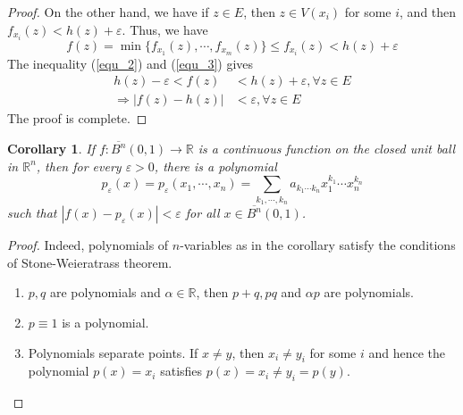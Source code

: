 \documentclass[12pt,leqno]{amsart}
\newtheorem{corollary}{Corollary}[theorem]
\theoremstyle{definition}
\numberwithin{equation}{subsection}
\begin{document}
\begin{proof}
On the other hand, we have if $z\in E$, then $z\in V(x_i)$ for some $i$, and then $f_{x_i}(z) < h(z) + \varepsilon$. Thus, we have 
\begin{equation}\label{equ_3}
    f(z) = \min\{f_{x_1}(z), \cdots,f_{x_m}(z)\} \leq f_{x_i}(z) < h(z) + \varepsilon
\end{equation}
The inequality (\ref{equ_2}) and (\ref{equ_3}) gives 
\begin{align*}
    h(z) - \varepsilon < f(z) & < h(z) + \varepsilon, \forall z\in E \\
    \Rightarrow \left|f(z) - h(z)\right| & < \varepsilon, \forall z\in E
\end{align*}
The proof is complete.
\end{proof}

\begin{corollary}
If $f:\overline{B^n}(0,1)\to\mathbb{R}$ is a continuous function on the closed unit ball in $\mathbb{R}^n$, then for every $\varepsilon > 0$, there is a polynomial $$p_\varepsilon(x) = p_\varepsilon(x_1,\cdots,x_n) = \sum_{k_1,\cdots,k_n}a_{k_1 \cdots k_n}x_1^{k_1}\cdots x_n^{k_n}$$
such that $|f(x) - p_\varepsilon(x)| < \varepsilon$ for all $x\in \overline{B^n}(0,1)$.
\end{corollary}
\begin{proof}
Indeed, polynomials of $n$-variables as in the corollary satisfy the conditions of Stone-Weieratrass theorem.
\begin{enumerate}
    \item $p,q$ are polynomials and $\alpha\in\mathbb{R}$, then $p+q, pq$ and $\alpha p$ are polynomials.
    \item $p\equiv 1$ is a polynomial.
    \item Polynomials separate points. If $x\neq y$, then $x_i\neq y_i$ for some $i$ and hence the polynomial $p(x) = x_i$ satisfies $p(x) = x_i \neq y_i = p(y)$.
\end{enumerate}
\end{proof}
\end{document}
